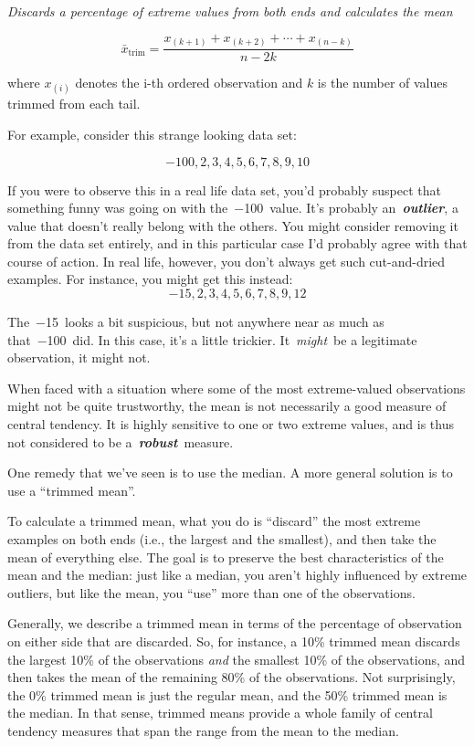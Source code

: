 \documentclass[
  letterpaper,
  DIV=11,
  numbers=noendperiod]{scrartcl}
\begin{document}
\emph{Discards a percentage of extreme values from both ends and
calculates the mean}

\[\bar{x}_{\text{trim}} =\frac{x_{(k+1)} + x_{(k+2)} + \cdots + x_{(n-k)}}{n - 2k}\]

where \(x_{(i)}\) denotes the i-th ordered observation and \(k\) is the
number of values trimmed from each tail.

For example, consider this strange looking data set:

\[ -100, 2, 3, 4, 5, 6, 7, 8, 9, 10 \]

If you were to observe this in a real life data set, you'd probably
suspect that something funny was going on with the~−100~value. It's
probably an~\textbf{\emph{outlier}}, a value that doesn't really belong
with the others. You might consider removing it from the data set
entirely, and in this particular case I'd probably agree with that
course of action. In real life, however, you don't always get such
cut-and-dried examples. For instance, you might get this instead:\\
\[ −15,2,3,4,5,6,7,8,9,12 \]

The~−15~looks a bit suspicious, but not anywhere near as much as
that~−100~did. In this case, it's a little trickier. It~\emph{might}~be
a legitimate observation, it might not.

When faced with a situation where some of the most extreme-valued
observations might not be quite trustworthy, the mean is not necessarily
a good measure of central tendency. It is highly sensitive to one or two
extreme values, and is thus not considered to be
a~\textbf{\emph{robust}}~measure.~

One remedy that we've seen is to use the median. A more general solution
is to use a ``trimmed mean''.~

To calculate a trimmed mean, what you do is ``discard'' the most extreme
examples on both ends (i.e., the largest and the smallest), and then
take the mean of everything else. The goal is to preserve the best
characteristics of the mean and the median: just like a median, you
aren't highly influenced by extreme outliers, but like the mean, you
``use'' more than one of the observations.~

Generally, we describe a trimmed mean in terms of the percentage of
observation on either side that are discarded. So, for instance, a 10\%
trimmed mean discards the largest 10\% of the observations \emph{and}
the smallest 10\% of the observations, and then takes the mean of the
remaining 80\% of the observations. Not surprisingly, the 0\% trimmed
mean is just the regular mean, and the 50\% trimmed mean is the median.
In that sense, trimmed means provide a whole family of central tendency
measures that span the range from the mean to the median.
\end{document}
